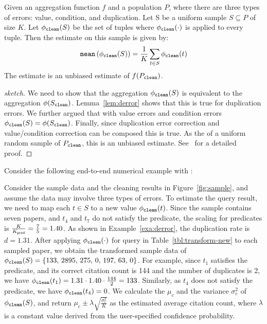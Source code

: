 \begin{theorem}\label{thm:sampleclean}
Given an aggregation function $f$ and a population $P$,
where there are three types of errors: value, condition, and duplication.
Let S be a uniform sample $S \subseteq P$ of size $K$.
Let $\phi_{\texttt{clean} } (S)$ be the set of tuples where $\phi_{\texttt{clean} } (\cdot)$ is applied to every tuple.
Then the estimate on this sample is given by:
\[ \texttt{mean}  \left( \phi_{\texttt{clean} } (S) \right) = \frac{1}{K}\sum_{t\in S} \phi_{\texttt{clean} } (t) \]
The estimate is an unbiased estimate of $f(P_{\texttt{clean} })$.
\end{theorem}
\begin{proof}[sketch]
We need to show that the aggregation $\phi_{\texttt{clean} } (S)$ is equivalent to the aggregation $\phi (S_{\texttt{clean} })$.
Lemma~\ref{lem:derror} shows that this is true for duplication errors.
We further argued that with value errors and condition errors $\phi_{\texttt{clean} } (S) = \phi (S_{\texttt{clean} })$.
Finally, since duplication error correction and value/condition correction can be composed this is true.
As the \mean of a uniform random sample of $P_{\texttt{clean} }$, this is an unbiased estimate.
See~\cite{saqpfull} for a detailed proof.
\end{proof}

Consider the following end-to-end numerical example with \sampleclean:

\begin{example}\label{exa:sampleclean}
Consider the sample data and the cleaning results in Figure~\ref{fig:sample}, and assume the data may involve three types of errors.
To estimate the query result, we need to map each $t \in S$ to a new value $\phi_{\texttt{clean} } (t)$.
Since the sample contains seven papers, and $t_4$ and $t_7$ do not satisfy the predicate, the scaling for predicates is $\frac{K}{K_{\texttt{pred} }} = \frac{7}{5}=1.40$.
As shown in Example~\ref{exa:derror}, the duplication rate is $d = 1.31$.
After applying $\phi_{\texttt{clean} } (\cdot)$ for \avgfunc query in Table~\ref{tbl:transform-new} to each sampled paper, we obtain the transformed sample data of $\phi_{\texttt{clean} } (S) = \{133,\, 2895,\, 275,\, 0,\, 197,\, 63,\, 0\}$.
For example, since $t_1$ satisfies the predicate, and its correct citation count is 144 and the number of duplicates is 2, we have $\phi_{\texttt{clean} } (t_1) = 1.31\cdot 1.40 \cdot\frac{144}{2} = 133$.
Similarly, as $t_4$ does not satisfy the predicate, we have $\phi_{\texttt{clean} } (t_4) = 0$. 
We calculate the \mean $\mu_c$ and the variance $\sigma_c^2$ of $\phi_{\texttt{clean} } (S)$, and return $\mu_c \pm \lambda \sqrt{\frac{\sigma_c^2}{K}}$ as the estimated average citation count, where $\lambda$ is a constant value derived from the user-specified confidence probability.
\end{example}

